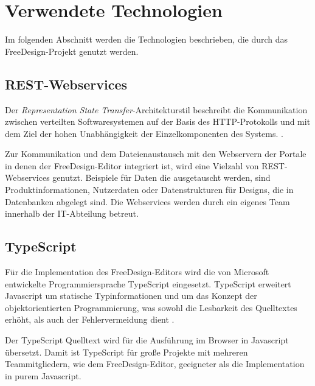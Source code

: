 

\section{Verwendete Technologien}
Im folgenden Abschnitt werden die Technologien beschrieben, die durch das FreeDesign-Projekt genutzt werden. 

\subsection{REST-Webservices}
Der \emph{Representation State Transfer}-Architekturstil beschreibt die Kommunikation zwischen verteilten Softwaresystemen auf der Basis des HTTP-Protokolls und mit dem Ziel der hohen Unabhängigkeit der Einzelkomponenten des Systems. \autocite[vgl.][105-106]{Fielding2000}.

Zur Kommunikation und dem Dateienaustausch mit den Webservern der Portale in denen der FreeDesign-Editor integriert ist, wird eine Vielzahl von REST-Webservices genutzt. 
Beispiele für Daten die ausgetauscht werden, sind Produktinformationen, Nutzerdaten oder Datenstrukturen für Designs, die in Datenbanken abgelegt sind.
Die Webservices werden durch ein eigenes Team innerhalb der IT-Abteilung betreut.  

\subsection{TypeScript}
Für die Implementation des FreeDesign-Editors wird die von Microsoft entwickelte Programmiersprache TypeScript eingesetzt. TypeScript erweitert Javascript um statische Typinformationen und um das Konzept der objektorientierten Programmierung, was sowohl die Lesbarkeit des Quelltextes erhöht, als auch der Fehlervermeidung dient \autocite[vgl.][S. 111]{Zeigermann2014}. 

Der TypeScript Quelltext wird für die Ausführung im Browser in Javascript übersetzt. Damit ist TypeScript für große Projekte mit mehreren Teammitgliedern, wie dem FreeDesign-Editor, geeigneter als die Implementation in purem Javascript.

